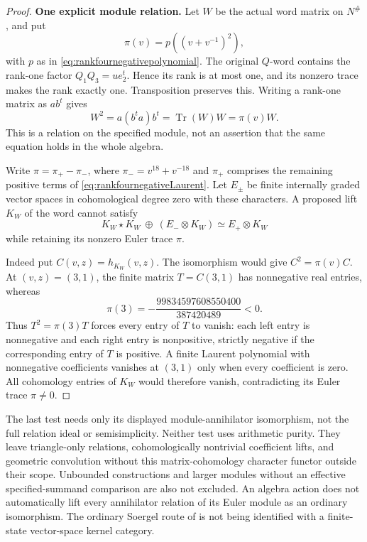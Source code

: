 \begin{proof}
\par\smallskip\noindent\textbf{One explicit module relation.}\quad
Let \(W\) be the actual  word matrix on \(N^\#\),
and put
\[
\pi(v)=p((v+v^{-1})^2),
\]
with \(p\) as in \eqref{eq:rankfournegativepolynomial}.
The original \(Q\)-word contains the rank-one factor
\(Q_1Q_3=ue_2^t\). Hence its rank is at most one,
and its nonzero trace makes the rank exactly one.
Transposition preserves this.
Writing a rank-one matrix as \(ab^t\) gives
\[
W^2=a(b^ta)b^t=\operatorname{Tr}(W)W=\pi(v)W.
\]
This is a relation on the specified module, not an assertion
that the same equation holds in the whole algebra.

Write \(\pi=\pi_+-\pi_-\), where
\(\pi_-=v^{18}+v^{-18}\) and \(\pi_+\) comprises the
remaining positive terms of
\eqref{eq:rankfournegativeLaurent}.
Let \(E_\pm\) be finite internally graded vector spaces
in cohomological degree zero with these characters.
A proposed lift \(K_W\) of the word cannot satisfy
\begin{equation}\label{eq:rankonewordisomorphismgate}
K_W\star K_W\ \oplus\ (E_-\otimes K_W)
\simeq E_+\otimes K_W
\end{equation}
while retaining its nonzero Euler trace \(\pi\).

Indeed put \(C(v,z)=h_{K_W}(v,z)\).
The isomorphism would give \(C^2=\pi(v)C\).
At \((v,z)=(3,1)\), the finite matrix \(T=C(3,1)\)
has nonnegative real entries, whereas
\[
\pi(3)=-\frac{99834597608550400}{387420489}<0.
\]
Thus \(T^2=\pi(3)T\) forces every entry of \(T\) to
vanish: each left entry is nonnegative and each right
entry is nonpositive, strictly negative if the corresponding
entry of \(T\) is positive.
A finite Laurent polynomial with nonnegative coefficients
vanishes at \((3,1)\) only when every coefficient is zero.
All cohomology entries of \(K_W\) would therefore vanish,
contradicting its Euler trace \(\pi\ne0\).
\end{proof}

The last test needs only its displayed module-annihilator
isomorphism, not the full relation ideal or semisimplicity.
Neither test uses arithmetic purity.
They leave triangle-only relations, cohomologically nontrivial
coefficient lifts, and geometric convolution without this
matrix-cohomology character functor outside their scope.
Unbounded constructions and larger modules without an effective
specified-summand comparison are also not excluded.
An algebra action does not automatically lift every annihilator
relation of its Euler module as an ordinary isomorphism.
The ordinary Soergel route of  is not being identified
with a finite-state vector-space kernel category.

